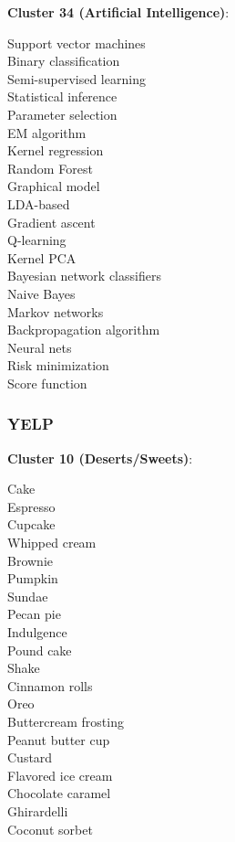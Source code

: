 \documentclass[11pt]{article}
\begin{document}
\textbf{Cluster 34 (Artificial Intelligence)}:
\begin{multicols}{3}
Support vector machines\\
Binary classification\\
Semi-supervised learning\\
Statistical inference\\
Parameter selection\\
EM algorithm\\
Kernel regression\\
Random Forest\\
Graphical model\\
LDA-based\\
Gradient ascent\\
Q-learning\\
Kernel PCA\\
Bayesian network classifiers\\
Naive Bayes\\
Markov networks\\
Backpropagation algorithm\\
Neural nets\\
Risk minimization\\
Score function
\end{multicols}

\subsubsection*{YELP}
\textbf{Cluster 10 (Deserts/Sweets)}:
\begin{multicols}{3}
Cake\\
Espresso\\
Cupcake\\
Whipped cream\\
Brownie\\
Pumpkin\\
Sundae\\
Pecan pie\\
Indulgence\\
Pound cake\\
Shake\\
Cinnamon rolls\\
Oreo\\
Buttercream frosting\\
Peanut butter cup\\
Custard\\
Flavored ice cream\\
Chocolate caramel\\
Ghirardelli\\
Coconut sorbet
\end{multicols}
\end{document}
